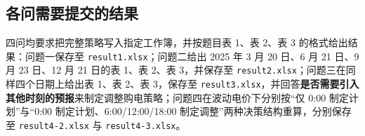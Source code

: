 \subsection{各问需要提交的结果}

四问均要求把完整策略写入指定工作簿，并按题目表 1、表 2、表 3 的格式给出结果：问题一保存至 \texttt{result1.xlsx}；问题二给出 2025 年 3 月 20 日、6 月 21 日、9 月 23 日、12 月 21 日的表 1、表 2、表 3，并保存至 \texttt{result2.xlsx}；问题三在同样四个日期上给出表 1、表 2、表 3，保存至 \texttt{result3.xlsx}，并回答\textbf{是否需要引入其他时刻的预报}来制定调整购电策略；问题四在波动电价下分别按``仅 0:00 制定计划''与``0:00 制定计划、6:00/12:00/18:00 制定调整''两种决策结构重算，分别保存至 \texttt{result4-2.xlsx} 与 \texttt{result4-3.xlsx}。
